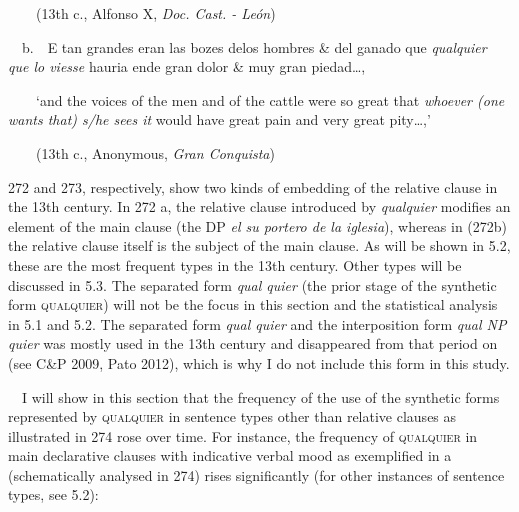 \begin{styleStandard}
\ \ \ \ (13th c., Alfonso X, \textit{Doc. Cast. - León})
\end{styleStandard}

\begin{styleStandard}
\ \ b.\ \ E tan grandes eran las bozes delos hombres \& del ganado que \textit{qualquier que lo viesse} hauria ende gran dolor \& muy gran piedad…, 
\end{styleStandard}

\begin{styleStandard}
\ \ \ \ ‘and the voices of the men and of the cattle were so great that \textit{whoever (one wants that) s/he sees it} would have great pain and very great pity…,’
\end{styleStandard}

\begin{styleStandard}
\ \ \ \ (13th c.,\textit{ }Anonymous,\textit{ Gran Conquista})
\end{styleStandard}

\begin{styleStandard}
272 and 273, respectively, show two kinds of embedding of the relative clause in the 13th century. In 272 a, the relative clause introduced by \textit{qualquier} modifies an element of the main clause (the DP \textit{el su portero de la iglesia}), whereas in (272b) the relative clause itself is the subject of the main clause. As will be shown in 5.2, these are the most frequent types in the 13th century. Other types will be discussed in 5.3. The separated form \textit{qual quier} (the prior stage of the synthetic form \textsc{qualquier}) will not be the focus in this section and the statistical analysis in 5.1 and 5.2. The separated form \textit{qual quier} and the interposition form \textit{qual NP quier} was mostly used in the 13th century and disappeared from that period on (see C\&P 2009, Pato 2012), which is why I do not include this form in this study. 
\end{styleStandard}

\begin{styleStandard}
\ \ I will show in this section that the frequency of the use of the synthetic forms represented by \textsc{qualquier} in sentence types other than relative clauses as illustrated in 274 rose over time. For instance, the frequency of \textsc{qualquier} in main declarative clauses with indicative verbal mood as exemplified in a (schematically analysed in 274) rises significantly (for other instances of sentence types, see 5.2):
\end{styleStandard}

